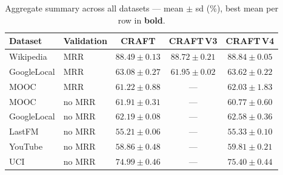 \documentclass[11pt]{article}
\begin{document}
\begin{table}[H]
\centering
\caption{Aggregate summary across all datasets --- mean $\pm$ sd (\%), best mean per row in \textbf{bold}.}
\begin{tabular}{llccc}
\toprule
Dataset & Validation & CRAFT & CRAFT\,V3 & CRAFT\,V4 \\
\midrule
Wikipedia   & MRR    & $88.49 \pm 0.13$ & $88.72 \pm 0.21$ & $\mathbf{88.84 \pm 0.05}$ \\
GoogleLocal & MRR    & $63.08 \pm 0.27$ & $61.95 \pm 0.02$ & $\mathbf{63.62 \pm 0.22}$ \\
MOOC        & MRR    & $61.22 \pm 0.88$ & ---              & $\mathbf{62.03 \pm 1.83}$ \\
MOOC        & no MRR & $\mathbf{61.91 \pm 0.31}$ & ---     & $60.77 \pm 0.60$ \\
GoogleLocal & no MRR & $62.19 \pm 0.08$ & ---              & $\mathbf{62.58 \pm 0.36}$ \\
LastFM      & no MRR & $55.21 \pm 0.06$ & ---              & $\mathbf{55.33 \pm 0.10}$ \\
YouTube     & no MRR & $58.86 \pm 0.48$ & ---              & $\mathbf{59.81 \pm 0.21}$ \\
UCI         & no MRR & $74.99 \pm 0.46$ & ---              & $\mathbf{75.40 \pm 0.44}$ \\
\bottomrule
\end{tabular}
\end{table}

\FloatBarrier
\end{document}
